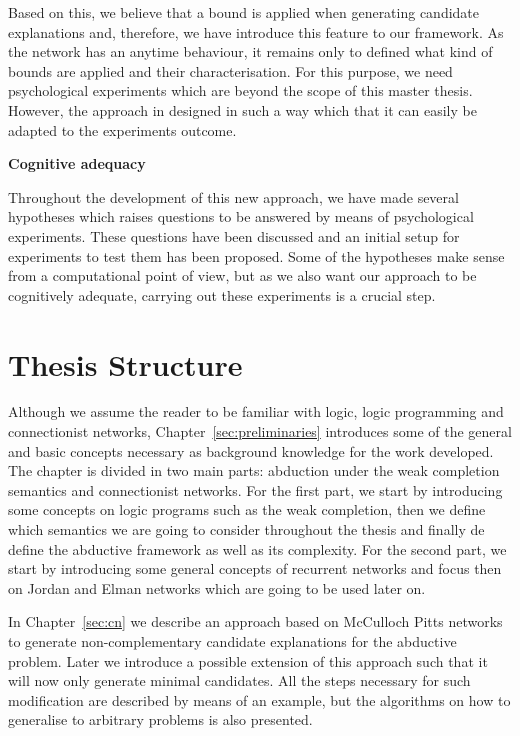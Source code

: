 Based on this, we believe that a bound is applied when generating candidate explanations and, therefore, we have introduce this feature to our framework. As the network has an anytime behaviour, it remains only to defined what kind of bounds are applied and their characterisation. For this purpose, we need psychological experiments which are beyond the scope of this master thesis. However, the approach in designed in such a way which that it can easily be adapted to the experiments outcome.  

\textbf{Cognitive adequacy}

Throughout the development of this new approach, we have made several hypotheses which raises questions to be answered by means of psychological experiments. These questions have been discussed and an initial setup for experiments to test them has been proposed. Some of the hypotheses make sense from a computational point of view, but as we also want our approach to be cognitively adequate, carrying out these experiments is a crucial step. 

\section{Thesis Structure}

Although we assume the reader to be familiar with logic, logic programming and connectionist networks, Chapter~\ref{sec:preliminaries} introduces some of the general and basic concepts necessary as background knowledge for the work developed. The chapter is divided in two main parts: abduction under the weak completion semantics and connectionist networks. For the first part, we start by introducing some concepts on logic programs such as the weak completion, then we define which semantics we are going to consider throughout the thesis and finally de define the abductive framework as well as its complexity. For the second part, we start by introducing some general concepts of recurrent networks and focus then on Jordan and Elman networks which are going to be used later on.

In Chapter~\ref{sec:cn} we describe an approach based on McCulloch Pitts networks to generate non-complementary candidate explanations for the abductive problem. Later we introduce a possible extension of this approach such that it will now only generate minimal candidates. All the steps necessary for such modification are described by means of an example, but the algorithms on how to generalise to arbitrary problems is also presented.

